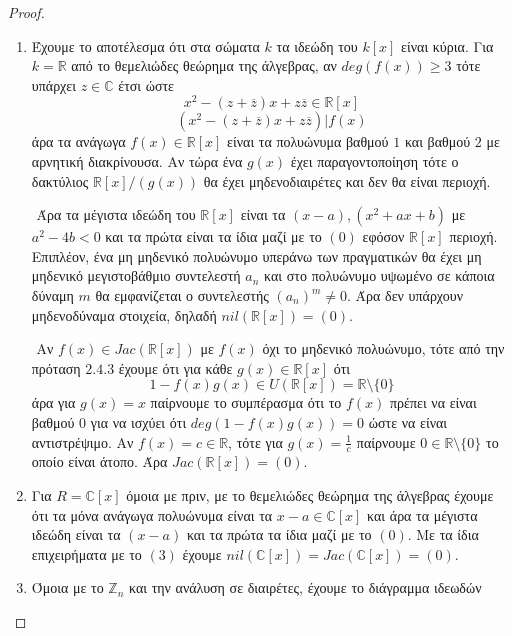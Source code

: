 \documentclass[oneside,a4paper]{article}
\begin{document}
\begin{proof}
\begin{enumerate}
\item Έχουμε το αποτέλεσμα ότι στα σώματα $k$ τα ιδεώδη του $k[x]$ είναι κύρια. Για $k=\mathbb{R}$ από το θεμελιώδες θεώρημα της άλγεβρας, αν $deg(f(x)) \geq 3$ τότε υπάρχει $z \in \mathbb{C}$ έτσι ώστε
$$x^2 - (z + \overline{z})x + z\overline{z} \in \mathbb{R}[x]$$
$$(x^2 - (z + \overline{z})x + z\overline{z}) | f(x)$$
άρα τα ανάγωγα $f(x) \in \mathbb{R}[x]$ είναι τα πολυώνυμα βαθμού $1$ και βαθμού $2$ με αρνητική διακρίνουσα. Αν τώρα ένα $g(x)$ έχει παραγοντοποίηση τότε ο δακτύλιος $\mathbb{R}[x]/(g(x))$ θα έχει μηδενοδιαιρέτες και δεν θα είναι περιοχή.

$ $\newline 
Άρα τα μέγιστα ιδεώδη του $\mathbb{R}[x]$ είναι τα $(x - a), (x^2 + ax + b)$ με $a^2-4b <0$ και τα πρώτα είναι τα ίδια μαζί με το $(0)$ εφόσον $\mathbb{R}[x]$ περιοχή. Επιπλέον, ένα μη μηδενικό πολυώνυμο υπεράνω των πραγματικών θα έχει μη μηδενικό μεγιστοβάθμιο συντελεστή $a_n$ και στο πολυώνυμο υψωμένο σε κάποια δύναμη $m$ θα εμφανίζεται ο συντελεστής $(a_n)^m \neq 0$. Άρα δεν υπάρχουν μηδενοδύναμα στοιχεία, δηλαδή $nil(\mathbb{R}[x]) = (0)$.

$ $\newline 
Αν $f(x) \in Jac(\mathbb{R}[x])$ με $f(x)$ όχι το μηδενικό πολυώνυμο, τότε από την πρόταση $2.4.3$ έχουμε ότι για κάθε $g(x) \in \mathbb{R}[x]$ ότι
$$1-f(x)g(x) \in U(\mathbb{R}[x]) = \mathbb{R} \setminus \{0\}$$
άρα για $g(x) = x$ παίρνουμε το συμπέρασμα ότι το $f(x)$ πρέπει να είναι βαθμού $0$ για να ισχύει ότι $deg(1-f(x)g(x))=0$ ώστε να είναι αντιστρέψιμο. Αν $f(x)=c \in \mathbb{R}$, τότε για $g(x) = \frac1c$ παίρνουμε $0 \in \mathbb{R}\setminus \{0\}$ το οποίο είναι άτοπο. Άρα $Jac(\mathbb{R}[x]) = (0)$.

\item Για $R = \mathbb{C}[x]$ όμοια με πριν, με το θεμελιώδες θεώρημα της άλγεβρας έχουμε ότι τα μόνα ανάγωγα πολυώνυμα είναι τα $x-a \in \mathbb{C}[x]$ και άρα τα μέγιστα ιδεώδη είναι τα $(x-a)$ και τα πρώτα τα ίδια μαζί με το $(0)$. Με τα ίδια επιχειρήματα με το $(3)$ έχουμε $nil(\mathbb{C}[x]) = Jac(\mathbb{C}[x]) = (0)$.


\item Όμοια με το $\mathbb{Z}_n$ και την ανάλυση σε διαιρέτες, έχουμε το διάγραμμα ιδεωδών



\end{enumerate}
\end{proof}
\end{document}
